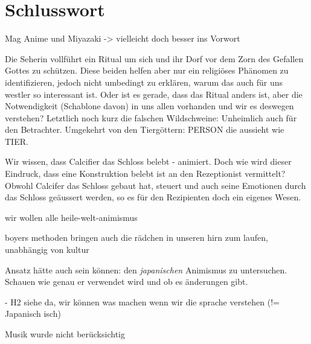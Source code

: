 \section*{Schlusswort}

Mag Anime und Miyazaki -> vielleicht doch besser ins Vorwort

Die Seherin vollführt ein Ritual um sich und ihr Dorf vor dem Zorn des Gefallen Gottes zu schützen. Diese beiden helfen aber nur ein religiöses Phänomen zu identifizieren, jedoch nicht umbedingt zu erklären, warum das auch für uns westler so interessant ist. Oder ist es gerade, dass das Ritual anders ist, aber die Notwendigkeit (Schablone davon) in uns allen vorhanden und wir es deswegen verstehen? Letztlich noch kurz die falschen Wildschweine: Unheimlich auch für den Betrachter. Umgekehrt von den Tiergöttern: PERSON die aussieht wie TIER.

Wir wissen, dass Calcifier das Schloss belebt - animiert. Doch wie wird dieser Eindruck, dass eine Konstruktion belebt ist an den Rezeptionist vermittelt?
Obwohl Calcifer das Schloss gebaut hat, steuert und auch seine Emotionen durch das Schloss geäussert werden, so es für den Rezipienten doch ein eigenes Wesen.

wir wollen alle heile-welt-animismus

boyers methoden bringen auch die rädchen in unseren hirn zum laufen, unabhängig von kultur

Ansatz hätte auch sein können: den \emph{japanischen} Animismus zu untersuchen. Schauen wie genau er verwendet wird und ob es änderungen gibt.

- H2 siehe da, wir können was machen wenn wir die sprache verstehen (!= Japanisch isch)

Musik wurde nicht berücksichtig